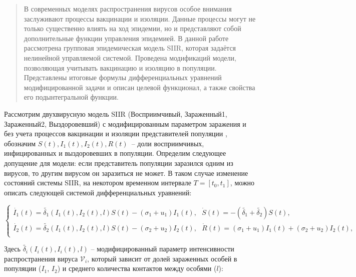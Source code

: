 \maketitle

\begin{abstract}
В современных моделях распространения вирусов особое внимания заслуживают процессы вакцинации и изоляции. Данные процессы могут не только существенно влиять на ход эпидемии, но и представляют собой дополнительные функции управления эпидемией. В данной работе рассмотрена групповая эпидемическая модель SIIR, которая задаётся нелинейной управляемой системой. Проведена модификаций модели, позволяющая учитывать вакцинацию и изоляцию в популяции. Представлены итоговые формулы дифференциальных уравнений модифицированной задачи и описан целевой функционал, а также свойства его подынтегральной функции.

\end{abstract}

Рассмотрим двухвирусную модель SIIR (Восприимчивый, Зараженный1, Зараженный2, Выздоровевший) с модифицированным параметром заражения и без учета процессов вакцинации и изоляции представителей популяции \cite{kosyan}, обозначим $S(t),I_1(t),I_2(t),R(t)$~-- доли восприимчивых, инфицированных и выздоровевших в популяции. Определим следующее допущение для модели: если представитель популяции заразился одним из вирусов, то другим вирусом он заразиться не может. В таком случае изменение состояний системы SIIR, на некотором временном интервале $T = [t_0, t_1]$, можно описать следующей системой дифференциальных уравнений:

\begin{equation}\label{SIIR_sys}
	\begin{cases}
        \dot{I_1}(t)=\widetilde{\delta_1}(I_1(t),I_2(t),l) S(t) - (\sigma_1 + u_1)I_1(t), 
        \ \ \
		\dot{S}(t)=-(\widetilde{\delta_1} + \widetilde{\delta_2})S(t), \\
        \dot{I_2}(t)=\widetilde{\delta_2}(I_1(t),I_2(t),l) S(t) - (\sigma_2 + u_2)I_2(t), 	\ \ \
		\dot{R}(t)=(\sigma_1+u_1) I_1(t)+(\sigma_2+u_2 )I_2(t), \\
	\end{cases}
\end{equation}

Здесь $\widetilde{\delta_i}(I_i(t),I_i(t),l)$ -- модифицированный параметр интенсивности распространения вируса $\mathcal{V}_i$, который зависит от долей зараженных особей в популяции ($I_1$, $I_2$) и среднего количества контактов между особями ($l$): 

